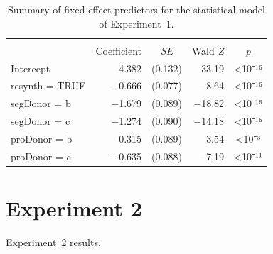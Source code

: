 \begin{table}
	\caption[Experiment~1 statistical model]{Summary of fixed effect predictors for the statistical model of Experiment~1.\label{tab:ExpOneFixedEff}}
	\centering
	\begin{tabu} spread 1em {Xrcrc}
		\toprule
		\rowfont{\bfseries}\\
		\rowfont[c]{\bfseries} & Coefficient & \textit{SE} & Wald \textit{Z} & \textit{p}\\
		\midrule
		Intercept         &  4.382 & (0.132) &  33.19 & <10⁻¹⁶\\
		resynth = TRUE    & −0.666 & (0.077) &  −8.64 & <10⁻¹⁶\\
		segDonor = \ac{b} & −1.679 & (0.089) & −18.82 & <10⁻¹⁶\\
		segDonor = \ac{c} & −1.274 & (0.090) & −14.18 & <10⁻¹⁶\\
		proDonor = \ac{b} &  0.315 & (0.089) &   3.54 & <10⁻³\\
		proDonor = \ac{c} & −0.635 & (0.088) &  −7.19 & <10⁻¹¹\\
		\bottomrule
	\end{tabu}
\end{table}


\section{Experiment 2}

Experiment~2 results.
